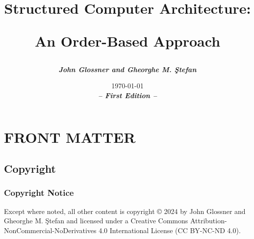 \documentclass[11pt]{book}
\begin{document}
\pagestyle{fancy}
\sloppy

\fancyhead{} %
\fancyhead[LO]{\scriptsize \leftmark} %
\fancyhead[RE]{\scriptsize \leftmark} %
\fancyfoot{} %
\fancyfoot[RO]{\footnotesize \thepage} %
\fancyfoot[LE]{\footnotesize \thepage} %


\title{Structured Computer Architecture: \par
An Order-Based Approach 
}
\author{{\bf {\em John Glossner and Gheorghe M. \c{S}tefan}}}
 \date{{{\today \\ \bf {\em -- First Edition  --}}}}


\maketitle

\part*{FRONT MATTER}

\chapter*{Copyright}

\section*{Copyright Notice}

\vspace{\baselineskip}\par
\noindent Except where noted, all other content is copyright © 2024 by John Glossner and Gheorghe M. \c{S}tefan and licensed under a Creative Commons Attribution-NonCommercial-NoDerivatives 4.0 International License (CC BY-NC-ND 4.0).
\end{document}
